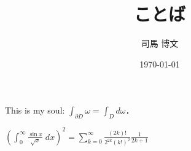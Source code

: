 \documentclass[uplatex, 12pt]{jsarticle}
\title{ことば}
\author{司馬 博文}
\date{\today}
\begin{document}
This is my soul: $\int_{\partial D}\omega=\int_Dd\omega$．

$\displaystyle\left(\int^\infty_0\frac{\sin x}{\sqrt{x}}\;dx\right)^2=\sum^\infty_{k=0}\frac{(2k)!}{2^{2k}(k!)^2}\frac{1}{2k+1}$ %
\end{document}
